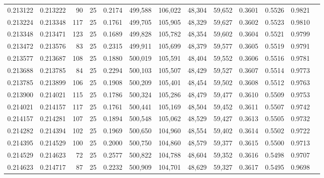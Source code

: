 \begin{tabular}{rrrrrrrrrrrrr}
0.213122 & 0.213222 &    90 &  25 &                                     0.2174 & 499,588 & 106,022 &  48,304 &  59,652 & 0.3601 & 0.5526 & 0.9821 \\
0.213224 & 0.213348 &   117 &  25 &                                     0.1761 & 499,705 & 105,905 &  48,329 &  59,627 & 0.3602 & 0.5523 & 0.9810 \\
0.213348 & 0.213471 &   123 &  25 &                                     0.1689 & 499,828 & 105,782 &  48,354 &  59,602 & 0.3604 & 0.5521 & 0.9799 \\
0.213472 & 0.213576 &    83 &  25 &                                     0.2315 & 499,911 & 105,699 &  48,379 &  59,577 & 0.3605 & 0.5519 & 0.9791 \\
0.213577 & 0.213687 &   108 &  25 &                                     0.1880 & 500,019 & 105,591 &  48,404 &  59,552 & 0.3606 & 0.5516 & 0.9781 \\
0.213688 & 0.213785 &    84 &  25 &                                     0.2294 & 500,103 & 105,507 &  48,429 &  59,527 & 0.3607 & 0.5514 & 0.9773 \\
0.213785 & 0.213899 &   106 &  25 &                                     0.1908 & 500,209 & 105,401 &  48,454 &  59,502 & 0.3608 & 0.5512 & 0.9763 \\
0.213900 & 0.214021 &   115 &  25 &                                     0.1786 & 500,324 & 105,286 &  48,479 &  59,477 & 0.3610 & 0.5509 & 0.9753 \\
0.214021 & 0.214157 &   117 &  25 &                                     0.1761 & 500,441 & 105,169 &  48,504 &  59,452 & 0.3611 & 0.5507 & 0.9742 \\
0.214157 & 0.214281 &   107 &  25 &                                     0.1894 & 500,548 & 105,062 &  48,529 &  59,427 & 0.3613 & 0.5505 & 0.9732 \\
0.214282 & 0.214394 &   102 &  25 &                                     0.1969 & 500,650 & 104,960 &  48,554 &  59,402 & 0.3614 & 0.5502 & 0.9722 \\
0.214395 & 0.214529 &   100 &  25 &                                     0.2000 & 500,750 & 104,860 &  48,579 &  59,377 & 0.3615 & 0.5500 & 0.9713 \\
0.214529 & 0.214623 &    72 &  25 &                                     0.2577 & 500,822 & 104,788 &  48,604 &  59,352 & 0.3616 & 0.5498 & 0.9707 \\
0.214623 & 0.214717 &    87 &  25 &                                     0.2232 & 500,909 & 104,701 &  48,629 &  59,327 & 0.3617 & 0.5495 & 0.9698 \\

\end{tabular}
